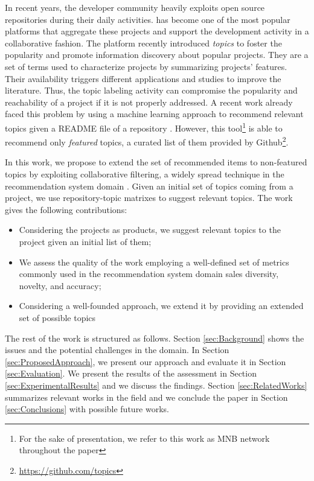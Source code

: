 In recent years, the developer community heavily exploits open source repositories during their daily activities. \GH has become one of the most
popular platforms that aggregate these projects and
support the development activity in a collaborative fashion.
%
The platform recently introduced \emph{topics} to foster the popularity and promote information discovery about popular projects. They are a set of terms used to characterize projects by summarizing projects' features. Their availability triggers different applications and studies to improve the literature. 
Thus, the topic labeling activity can compromise the popularity and reachability of a project if it is not properly addressed. A recent work already faced this problem by using a machine learning approach to recommend relevant topics given a README file of a repository  \cite{MNB}. However, this tool\footnote{For the sake of presentation, we refer to this work as MNB network throughout the paper} is able to recommend only \emph{featured} topics, a curated list of them provided by Github\footnote{\url{https://github.com/topics}}.

In this work, we propose to extend the set of recommended items to non-featured topics by exploiting collaborative filtering, a widely spread technique in the recommendation system domain \cite{Schafer:2007:CFR:1768197.1768208}. Given an initial set of topics coming from a \GH project, we use repository-topic matrixes to suggest relevant topics.
The work gives the following contributions:
\begin{itemize}
\item Considering the \GH projects as products, we suggest relevant topics to the project given an initial list of them;
\item We assess the quality of the work employing a well-defined set of metrics commonly used in the recommendation system domain \ie sales diversity, novelty, and accuracy;
\item Considering a well-founded approach, we extend it by providing an extended set of possible topics  
\end{itemize}

The rest of the work is structured as follows. Section \ref{sec:Background} shows the issues and the potential challenges in the domain. In Section \ref{sec:ProposedApproach}, we present our approach and evaluate it in Section \ref{sec:Evaluation}. We present the results of the assessment in Section \ref{sec:ExperimentalResults} and we discuss the findings. Section \ref{sec:RelatedWorks} summarizes relevant works in the field and we conclude the paper in Section \ref{sec:Conclusions} with possible future works.
